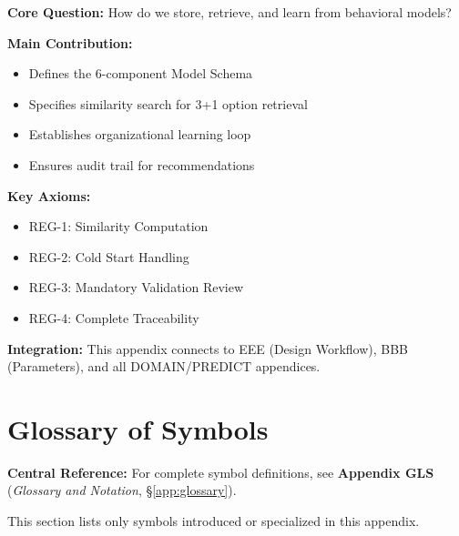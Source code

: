 \begin{tcolorbox}[colback=green!10!white, colframe=green!75!black,
    title=\textbf{Appendix REG: Summary}]

\textbf{Core Question:} How do we store, retrieve, and learn from behavioral models?

\textbf{Main Contribution:}
\begin{itemize}[nosep]
    \item Defines the 6-component Model Schema
    \item Specifies similarity search for 3+1 option retrieval
    \item Establishes organizational learning loop
    \item Ensures audit trail for recommendations
\end{itemize}

\textbf{Key Axioms:}
\begin{itemize}[nosep]
    \item REG-1: Similarity Computation
    \item REG-2: Cold Start Handling
    \item REG-3: Mandatory Validation Review
    \item REG-4: Complete Traceability
\end{itemize}

\textbf{Integration:} This appendix connects to EEE (Design Workflow),
BBB (Parameters), and all DOMAIN/PREDICT appendices.

\end{tcolorbox}


\section{Glossary of Symbols}
\label{sec:fff-glossary}

\begin{tcolorbox}[colback=blue!5!white, colframe=blue!75!black]
\textbf{Central Reference:} For complete symbol definitions, see
\textbf{Appendix GLS} (\textit{Glossary and Notation}, \S\ref{app:glossary}).

This section lists only symbols introduced or specialized in this appendix.
\end{tcolorbox}

\vspace{0.5em}

